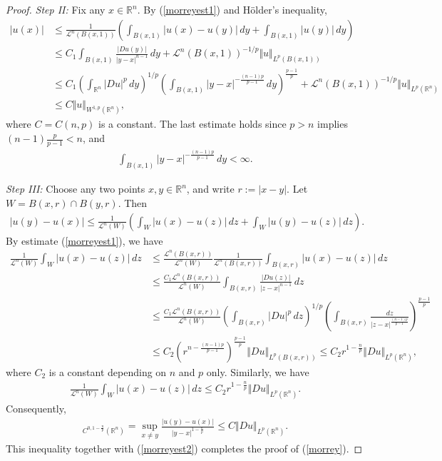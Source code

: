 \documentclass{article}
\numberwithin{equation}{section}
\newcommand{\bbR}{\mathbb{R}}
\theoremstyle{plain}
\theoremstyle{definition}
\begin{document}
\begin{proof}
\textit{Step II:} Fix any $x\in\bbR^n$. By (\ref{morreyest1}) and Hölder's inequality,
\begin{equation*}
	\begin{aligned}
	\vert u(x)\vert&\leq\frac{1}{\mathcal{L}^n(B(x,1))}\left(\int_{B(x,1)}\vert u(x)-u(y)\vert\,dy+\int_{B(x,1)}\vert u(y)\vert\,dy\right)\\
	&\leq C_1\int_{B(x,1)}\frac{\vert Du(y)\vert}{\vert y-x\vert^{n-1}}\,dy+\mathcal{L}^n(B(x,1))^{-1/p}\Vert u\Vert_{L^p(B(x,1))}\\
	&\leq C_1\left(\int_{\bbR^n}\vert Du\vert^p\,dy\right)^{1/p}\left(\int_{B(x,1)}\vert y-x\vert^{-\frac{(n-1)p}{p-1}}\,dy\right)^{\frac{p-1}{p}}+\mathcal{L}^n(B(x,1))^{-1/p}\Vert u\Vert_{L^p(\bbR^n)}\\
	&\leq C\Vert u\Vert_{W^{1,p}(\bbR^n)},
\end{aligned}\label{morreyest2}
\end{equation*}
where $C=C(n,p)$ is a constant. The last estimate holds since $p>n$ implies $(n-1)\frac{p}{p-1}<n$, and
\begin{align*}
	\int_{B(x,1)}\vert y-x\vert^{-\frac{(n-1)p}{p-1}}\,dy<\infty.
\end{align*}

\textit{Step III:} Choose any two points $x,y\in\bbR^n$, and write $r:=\vert x-y\vert$. Let $W=B(x,r)\cap B(y,r)$. Then
\begin{align*}
\vert u(y)-u(x)\vert\leq\frac{1}{\mathcal{L}^n(W)}\left(\int_W\vert u(x)-u(z)\vert\,dz + \int_W\vert u(y)-u(z)\vert\,dz\right).
\end{align*}
By estimate (\ref{morreyest1}), we have
\begin{align*}
	\frac{1}{\mathcal{L}^n(W)}\int_W\vert u(x)-u(z)\vert\,dz&\leq\frac{\mathcal{L}^n(B(x,r))}{\mathcal{L}^n(W)}\frac{1}{\mathcal{L}^n(B(x,r))}\int_{B(x,r)}\vert u(x)-u(z)\vert\,dz\\
	&\leq\frac{C_1\mathcal{L}^n(B(x,r))}{\mathcal{L}^n(W)}\int_{B(x,r)}\frac{\vert Du(z)\vert}{\vert z-x\vert^{n-1}}\,dz\\
	&\leq \frac{C_1\mathcal{L}^n(B(x,r))}{\mathcal{L}^n(W)}\left(\int_{B(x,r)}\vert Du\vert^p\,dz\right)^{1/p}\left(\int_{B(x,r)}\frac{dz}{\vert z-x\vert^{\frac{(n-1)p}{p-1}}}\right)^{\frac{p-1}{p}}\\
	&\leq C_2\left(r^{n-\frac{(n-1)p}{p-1}}\right)^{\frac{p-1}{p}}\Vert Du\Vert_{L^p(B(x,r))}\leq C_2r^{1-\frac{n}{p}}\Vert Du\Vert_{L^p(\bbR^n)},
\end{align*}
where $C_2$ is a constant depending on $n$ and $p$ only. Similarly, we have
\begin{align*}
	\frac{1}{\mathcal{L}^n(W)}\int_W\vert u(x)-u(z)\vert\,dz\leq C_2r^{1-\frac{n}{p}}\Vert Du\Vert_{L^p(\bbR^n)}.
\end{align*}
Consequently,
\begin{align*}
	[u]_{C^{0,1-\frac{n}{p}}(\bbR^n)}=\sup_{x\neq y}\frac{\vert u(y)-u(x)\vert}{\vert y-x\vert^{1-\frac{n}{p}}}\leq C\Vert Du\Vert_{L^p(\bbR^n)}.
\end{align*}
This inequality together with (\ref{morreyest2}) completes the proof of (\ref{morrey}).
\end{proof}
\end{document}
